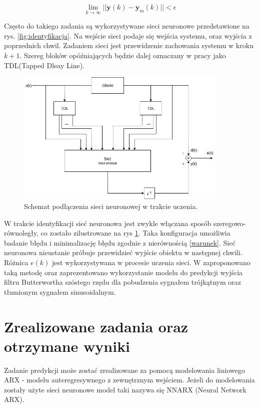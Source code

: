 \documentclass{article}
\newcommand{\bb}{\textbf}
\begin{document}
\begin{equation}
	\displaystyle{\lim_{k \to \infty}} ||\bb{y}(k)-\bb{y}_m(k)|| < \epsilon
\end{equation}

Często do takiego zadania są wykorzystywane sieci neuronowe przedstawione na rys. \ref{fig:identyfikacja}. Na wejście sieci podaje się wejścia systemu, oraz wyjścia z poprzednich chwil. Zadaniem sieci jest przewidzenie zachowania systemu w kroku $k+1$. Szereg bloków opóźniających będzie dalej oznaczany w pracy jako TDL(Tapped Dleay Line).

\begin{figure}
\centering
	\includegraphics[width=0.90\textwidth]{ident2.jpg}\par\vspace{1cm}
\caption{Schemat podłączenia sieci neuronowej w trakcie uczenia.}
	\label{fig:identyfikacja2}
\end{figure}

W trakcie identyfikacji sieć neuronowa jest zwykle włączana sposób szeregowo-równoległy, co zostało zilustrowane na rys \ref{fig:identyfikacja2}. Taka konfiguracja umożliwia badanie błędu i minimalizację błędu zgodnie z nierównością \ref{warunek}. Sieć neuronowa nieustanie próbuje przewidzieć wyjście obiektu w następnej chwili. Różnica $e(k)$ jest wykorzystywana w procesie uczenia sieci. W \cite{Osowski} zaproponowano taką metodę oraz zaprezentowano wykorzystanie modelu do predykcji wyjścia filtru Butterwortha szóstego rzędu dla pobudzenia sygnałem trójkątnym oraz tłumionym sygnałem sinusoidalnym.
\newpage
\section{Zrealizowane zadania oraz otrzymane wyniki}
Zadanie predykcji może zostać zrealizowane za pomocą modelowania liniowego ARX -
modelu auteregresywnego z zewnętrznym wejściem. Jeżeli do modelowania zostały
użyte sieci neuronowe model taki nazywa się NNARX (Neural Network ARX).
\end{document}
